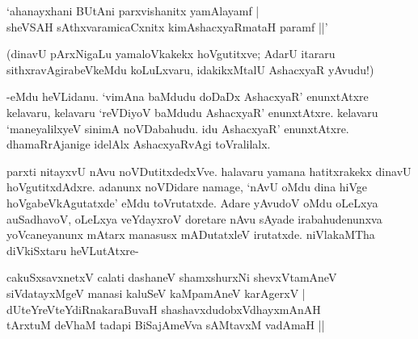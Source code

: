 \begin{shloka}
`ahanayxhani BUtAni parxvishanitx yamAlayamf |\\
sheVSAH sAthxvaramicaCxnitx kimAshacxyaRmataH paramf ||'
\end{shloka}

(dinavU pArxNigaLu yamaloVkakekx hoVgutitxve; AdarU itararu sithxravAgirabeVkeMdu koLuLxvaru, idakikxMtalU AshacxyaR yAvudu!)

-eMdu heVLidanu. `vimAna baMdudu doDaDx AshacxyaR' enunxtAtxre kelavaru, kelavaru `reVDiyoV baMdudu AshacxyaR' enunxtAtxre. kelavaru `maneyalilxyeV sinimA noVDabahudu. idu AshacxyaR' enunxtAtxre. dhamaRrAjanige idelAlx AshacxyaRvAgi toVralilalx.

parxti nitayxvU nAvu noVDutitxdedxVve. halavaru yamana hatitxrakekx dinavU hoVgutitxdAdxre. adanunx noVDidare namage, `nAvU oMdu dina hiVge hoVgabeVkAgutatxde' eMdu toVrutatxde. Adare yAvudoV oMdu oLeLxya auSadhavoV, oLeLxya veYdayxroV doretare nAvu sAyade irabahudenunxva yoVcaneyanunx mAtarx manasusx mADutatxleV irutatxde. niVlakaMTha diVkiSxtaru heVLutAtxre-

\begin{shloka}
cakuSxsavxnetxV calati dashaneV shamxshurxNi shevxVtamAneV\\
siVdatayxMgeV manasi kaluSeV kaMpamAneV karAgerxV |\\
dUteYreVteYdiRnakaraBuvaH shashavxdudobxVdhayxmAnAH\\
tArxtuM deVhaM tadapi BiSajAmeVva sAMtavxM vadAmaH ||
\end{shloka}


